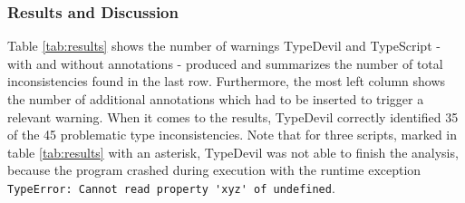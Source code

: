 \documentclass[runningheads,a4paper]{llncs}
\begin{document}
\subsubsection{Results and Discussion}
Table \ref{tab:results} shows the number of warnings TypeDevil and TypeScript - with and without annotations - produced and summarizes the number of total inconsistencies found in the last row.
Furthermore, the most left column shows the number of additional annotations which had to be inserted to trigger a relevant warning.
When it comes to the results, TypeDevil correctly identified 35 of the 45 problematic type inconsistencies.
Note that for three scripts, marked in table \ref{tab:results} with an asterisk, TypeDevil was not able to finish the analysis, because the program crashed during execution with the runtime exception \lstinline[columns=fixed]{TypeError: Cannot read property 'xyz' of undefined}.\\
\end{document}
